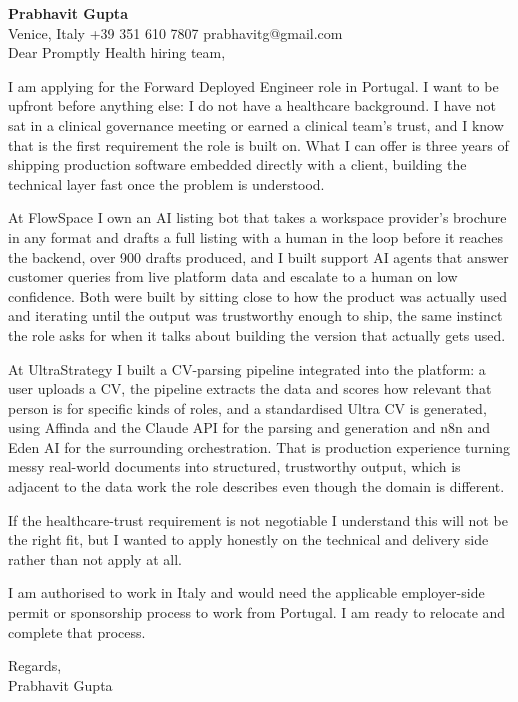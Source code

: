 \documentclass[a4paper,10.5pt]{article}
\begin{document}
\textbf{Prabhavit Gupta}\\
Venice, Italy \textbar{} +39 351 610 7807 \textbar{} prabhavitg@gmail.com\\[10pt]
Dear Promptly Health hiring team,

I am applying for the Forward Deployed Engineer role in Portugal. I want to be upfront before anything else: I do not have a healthcare background. I have not sat in a clinical governance meeting or earned a clinical team's trust, and I know that is the first requirement the role is built on. What I can offer is three years of shipping production software embedded directly with a client, building the technical layer fast once the problem is understood.

At FlowSpace I own an AI listing bot that takes a workspace provider's brochure in any format and drafts a full listing with a human in the loop before it reaches the backend, over 900 drafts produced, and I built support AI agents that answer customer queries from live platform data and escalate to a human on low confidence. Both were built by sitting close to how the product was actually used and iterating until the output was trustworthy enough to ship, the same instinct the role asks for when it talks about building the version that actually gets used.

At UltraStrategy I built a CV-parsing pipeline integrated into the platform: a user uploads a CV, the pipeline extracts the data and scores how relevant that person is for specific kinds of roles, and a standardised Ultra CV is generated, using Affinda and the Claude API for the parsing and generation and n8n and Eden AI for the surrounding orchestration. That is production experience turning messy real-world documents into structured, trustworthy output, which is adjacent to the data work the role describes even though the domain is different.

If the healthcare-trust requirement is not negotiable I understand this will not be the right fit, but I wanted to apply honestly on the technical and delivery side rather than not apply at all.

I am authorised to work in Italy and would need the applicable employer-side permit or sponsorship process to work from Portugal. I am ready to relocate and complete that process.

Regards,\\
Prabhavit Gupta
\end{document}
